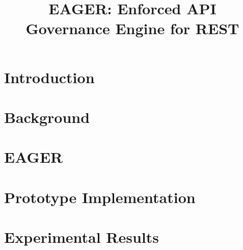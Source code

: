 \documentclass[conference]{IEEEtran}
\begin{document}
\title{EAGER: Enforced API Governance Engine for REST}

\author{
}\maketitle

\begin{abstract}

\end{abstract}




\section{Introduction}
\label{sec:intro}


\section{Background}
\label{sec:bg}


\section{EAGER}
\label{sec:eager}


\section{Prototype Implementation}
\label{sec:prototype_impl}


\section{Experimental Results}
\label{sec:results}


%
\end{document}
